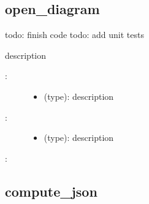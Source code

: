 \documentclass[letterpaper,10pt,english]{sphinxmanual}
\begin{document}
\subsection{open\_diagram}
\label{\detokenize{Phenotypes:open-diagram}}\label{\detokenize{Phenotypes:phenotypes-open-diagram}}

\begin{fulllineitems}
\label{\detokenize{Phenotypes:PyBoolNet.Phenotypes.open_diagram}}
todo: finish code
todo: add unit tests

description
\begin{description}
\item[{:}] \leavevmode\begin{itemize}
\item {} 
 (type): description

\end{itemize}

\item[{:}] \leavevmode\begin{itemize}
\item {} 
 (type): description

\end{itemize}

\end{description}

:

\begin{sphinxVerbatim}[commandchars=\\\{\}]
\end{sphinxVerbatim}

\end{fulllineitems}



\subsection{compute\_json}
\label{\detokenize{Phenotypes:phenotypes-compute-json}}\label{\detokenize{Phenotypes:compute-json}}
\end{document}
